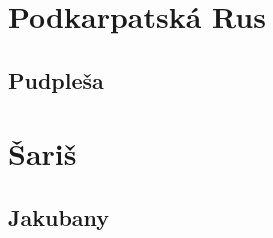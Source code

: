 \documentclass[a4paper]{book}
\begin{document}
\begin{center}
\chapter*{Podkarpatská Rus}
\section*{Pudpleša}
{%
\parindent 0pt
\noindent
\ifx\preLilyPondExample \undefined
\else
  \expandafter\preLilyPondExample
\fi
\def\lilypondbook{}%

\ifx\postLilyPondExample \undefined
\else
  \expandafter\postLilyPondExample
\fi
}
{%
\parindent 0pt
\noindent
\ifx\preLilyPondExample \undefined
\else
  \expandafter\preLilyPondExample
\fi
\def\lilypondbook{}%

\ifx\postLilyPondExample \undefined
\else
  \expandafter\postLilyPondExample
\fi
}
{%
\parindent 0pt
\noindent
\ifx\preLilyPondExample \undefined
\else
  \expandafter\preLilyPondExample
\fi
\def\lilypondbook{}%

\ifx\postLilyPondExample \undefined
\else
  \expandafter\postLilyPondExample
\fi
}

\chapter*{Šariš}
\section*{Jakubany}
{%
\parindent 0pt
\noindent
\ifx\preLilyPondExample \undefined
\else
  \expandafter\preLilyPondExample
\fi
\def\lilypondbook{}%

\ifx\postLilyPondExample \undefined
\else
  \expandafter\postLilyPondExample
\fi
}
{%
\parindent 0pt
\noindent
\ifx\preLilyPondExample \undefined
\else
  \expandafter\preLilyPondExample
\fi
\def\lilypondbook{}%

\ifx\postLilyPondExample \undefined
\else
  \expandafter\postLilyPondExample
\fi
}
{%
\parindent 0pt
\noindent
\ifx\preLilyPondExample \undefined
\else
  \expandafter\preLilyPondExample
\fi
\def\lilypondbook{}%

\ifx\postLilyPondExample \undefined
\else
  \expandafter\postLilyPondExample
\fi
}


\end{center}
\end{document}
